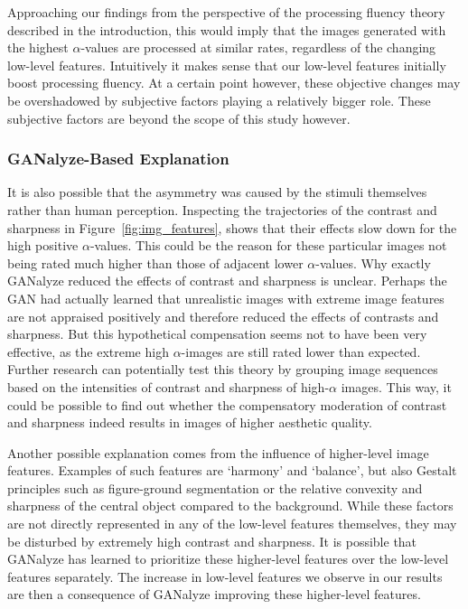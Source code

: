 \documentclass[../main.tex]{subfiles}
\begin{document}
Approaching our findings from the perspective of the processing fluency theory \parencite{reberProcessingFluencyAesthetic2004} described in the introduction, this would imply that the images generated with the highest $\alpha$-values are processed at similar rates, regardless of the changing low-level features. Intuitively it makes sense that our low-level features initially boost processing fluency. At a certain point however, these objective changes may be overshadowed by subjective factors playing a relatively bigger role. These subjective factors are beyond the scope of this study however.


\subsubsection{GANalyze-Based Explanation}
It is also possible that the asymmetry was caused by the stimuli themselves rather than human perception. Inspecting the trajectories of the contrast and sharpness in Figure~\ref{fig:img_features}, shows that their effects slow down for the high positive $\alpha$-values. This could be the reason for these particular images not being rated much higher than those of adjacent lower $\alpha$-values. Why exactly GANalyze reduced the effects of contrast and sharpness is unclear. Perhaps the GAN had actually learned that unrealistic images with extreme image features are not appraised positively and therefore reduced the effects of contrasts and sharpness. But this hypothetical compensation seems not to have been very effective, as the extreme high $\alpha$-images are still rated lower than expected. Further research can potentially test this theory by grouping image sequences based on the intensities of contrast and sharpness of high-$\alpha$ images. This way, it could be possible to find out whether the compensatory moderation of contrast and sharpness indeed results in images of higher aesthetic quality. 

Another possible explanation comes from the influence of higher-level image features. Examples of such features are `harmony' and `balance', but also Gestalt principles such as figure-ground segmentation or the relative convexity and sharpness of the central object compared to the background. While these factors are not directly represented in any of the low-level features themselves, they may be disturbed by extremely high contrast and sharpness. It is possible that GANalyze has learned to prioritize these higher-level features over the low-level features separately. The increase in low-level features we observe in our results are then a consequence of GANalyze improving these higher-level features.
\end{document}
